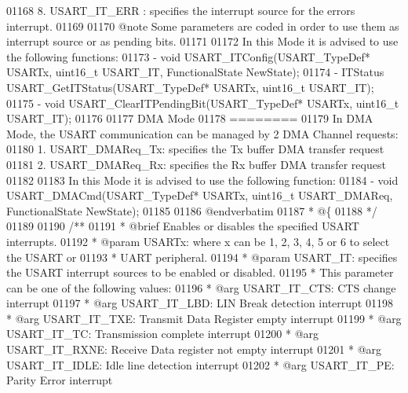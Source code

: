 \begin{DoxyCode}
01168 \textcolor{comment}{     8. USART\_IT\_ERR :  specifies the interrupt source for the errors interrupt.}
01169 \textcolor{comment}{}
01170 \textcolor{comment}{@note Some parameters are coded in order to use them as interrupt source or as pending bits.}
01171 \textcolor{comment}{}
01172 \textcolor{comment}{  In this Mode it is advised to use the following functions:}
01173 \textcolor{comment}{     - void USART\_ITConfig(USART\_TypeDef* USARTx, uint16\_t USART\_IT, FunctionalState NewState);}
01174 \textcolor{comment}{     - ITStatus USART\_GetITStatus(USART\_TypeDef* USARTx, uint16\_t USART\_IT);}
01175 \textcolor{comment}{     - void USART\_ClearITPendingBit(USART\_TypeDef* USARTx, uint16\_t USART\_IT);}
01176 \textcolor{comment}{}
01177 \textcolor{comment}{  DMA Mode}
01178 \textcolor{comment}{  ========}
01179 \textcolor{comment}{  In DMA Mode, the USART communication can be managed by 2 DMA Channel requests:}
01180 \textcolor{comment}{     1. USART\_DMAReq\_Tx: specifies the Tx buffer DMA transfer request}
01181 \textcolor{comment}{     2. USART\_DMAReq\_Rx: specifies the Rx buffer DMA transfer request}
01182 \textcolor{comment}{}
01183 \textcolor{comment}{  In this Mode it is advised to use the following function:}
01184 \textcolor{comment}{     - void USART\_DMACmd(USART\_TypeDef* USARTx, uint16\_t USART\_DMAReq, FunctionalState NewState);}
01185 \textcolor{comment}{}
01186 \textcolor{comment}{@endverbatim}
01187 \textcolor{comment}{  * @\{}
01188 \textcolor{comment}{  */}
01189 
01190 \textcolor{comment}{/**}
01191 \textcolor{comment}{  * @brief  Enables or disables the specified USART interrupts.}
01192 \textcolor{comment}{  * @param  USARTx: where x can be 1, 2, 3, 4, 5 or 6 to select the USART or }
01193 \textcolor{comment}{  *         UART peripheral.}
01194 \textcolor{comment}{  * @param  USART\_IT: specifies the USART interrupt sources to be enabled or disabled.}
01195 \textcolor{comment}{  *          This parameter can be one of the following values:}
01196 \textcolor{comment}{  *            @arg USART\_IT\_CTS:  CTS change interrupt}
01197 \textcolor{comment}{  *            @arg USART\_IT\_LBD:  LIN Break detection interrupt}
01198 \textcolor{comment}{  *            @arg USART\_IT\_TXE:  Transmit Data Register empty interrupt}
01199 \textcolor{comment}{  *            @arg USART\_IT\_TC:   Transmission complete interrupt}
01200 \textcolor{comment}{  *            @arg USART\_IT\_RXNE: Receive Data register not empty interrupt}
01201 \textcolor{comment}{  *            @arg USART\_IT\_IDLE: Idle line detection interrupt}
01202 \textcolor{comment}{  *            @arg USART\_IT\_PE:   Parity Error interrupt}

\end{DoxyCode}
